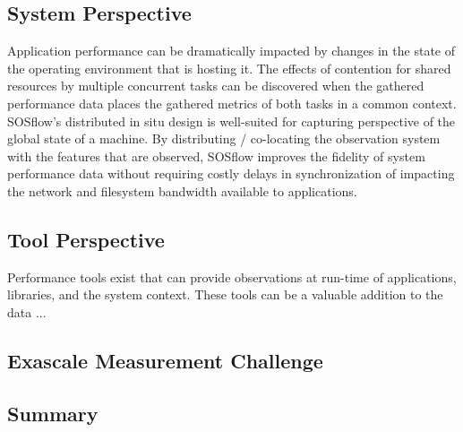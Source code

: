 \subsection{System Perspective} %
%
Application performance can be dramatically impacted by changes in the
state of the operating environment that is hosting it.
%
The effects of contention for shared resources by multiple concurrent
tasks can be discovered when the gathered performance data places the
gathered metrics of both tasks in a common context.
%
SOSflow's distributed in situ design is well-suited for capturing
perspective of the global state of a machine.
%
By distributing / co-locating the observation system with the features
that are observed, SOSflow improves the fidelity of system performance
data without requiring costly delays in synchronization of impacting
the network and filesystem bandwidth available to applications.
%
\subsection{Tool Perspective} %
%
Performance tools exist that can provide observations at run-time
of applications, libraries, and the system context.
%
These tools can be a valuable addition to the data ...
%
\subsection{Exascale Measurement Challenge} %
%
%
\subsection{Summary} %
%
%


